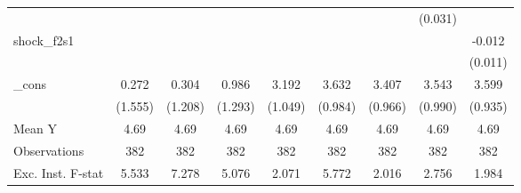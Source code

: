 {\begin{tabular}{l*{8}{c}}
            &                     &                     &                     &                     &                     &                     &     (0.031)         &                     \\
\addlinespace
shock\_f2s1  &                     &                     &                     &                     &                     &                     &                     &      -0.012         \\
            &                     &                     &                     &                     &                     &                     &                     &     (0.011)         \\
\addlinespace
\_cons      &       0.272         &       0.304         &       0.986         &       3.192\sym{***}&       3.632\sym{***}&       3.407\sym{***}&       3.543\sym{***}&       3.599\sym{***}\\
            &     (1.555)         &     (1.208)         &     (1.293)         &     (1.049)         &     (0.984)         &     (0.966)         &     (0.990)         &     (0.935)         \\
\midrule
Mean Y      &        4.69         &        4.69         &        4.69         &        4.69         &        4.69         &        4.69         &        4.69         &        4.69         \\
Observations&         382         &         382         &         382         &         382         &         382         &         382         &         382         &         382         \\
Exc. Inst. F-stat&       5.533         &       7.278         &       5.076         &       2.071         &       5.772         &       2.016         &       2.756         &       1.984         \\
\bottomrule
\end{tabular}
}
